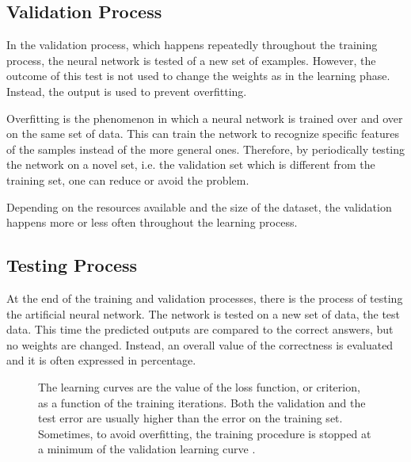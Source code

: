 
\subsection{Validation Process}
\label{ssec:Validation_Process}
In the validation process, which happens repeatedly throughout the training process, the neural network is tested of a new set of examples.
However, the outcome of this test is not used to change the weights as in the learning phase.
Instead, the output is used to prevent overfitting.

Overfitting is the phenomenon in which a neural network is trained over and over on the same set of data.
This can train the network to recognize specific features of the samples instead of the more general ones.
Therefore, by periodically testing the network on a novel set, i.e. the validation set which is different from the training set, one can reduce or avoid the problem.

Depending on the resources available and the size of the dataset, the validation happens more or less often throughout the learning process.


\subsection{Testing Process}
\label{ssec:Testing_Process}
At the end of the training and validation processes, there is the process of testing the artificial neural network.
The network is tested on a new set of data, the test data.
This time the predicted outputs are compared to the correct answers, but no weights are changed.
Instead, an overall value of the correctness is evaluated and it is often expressed in percentage.

\begin{figure}[htbp]
	\centering
	
	\caption{The learning curves are the value of the loss function, or criterion, as a function of the training iterations.
	Both the validation and the test error are usually higher than the error on the training set.
	Sometimes, to avoid overfitting, the training procedure is stopped at a minimum of the validation learning curve \cite{duda2012pattern}.
	}
	\label{fig:LVTcurves}
\end{figure}

